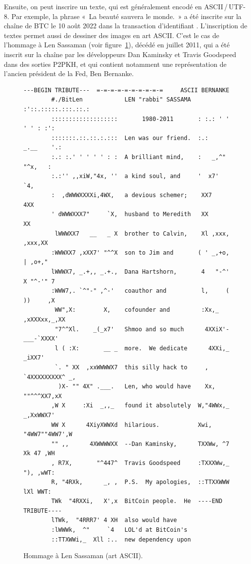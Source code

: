 Ensuite, on peut inscrire un texte, qui est généralement encodé en ASCII\,/\,UTF-8. Par exemple, la phrase «~La beauté sauvera le monde.~» a été inscrite sur la chaîne de BTC le 10 août 2022 dans la transaction d'identifiant . L'inscription de textes permet aussi de dessiner des images en art ASCII. C'est le cas de l'hommage à Len Sassaman (voir figure~\ref{fig:sassaman-tribute}), décédé en juillet 2011, qui a été inscrit sur la chaîne par les développeurs Dan Kaminsky et Travis Goodspeed dans des sorties P2PKH, et qui contient notamment une représentation de l'ancien président de la Fed, Ben Bernanke.

\begin{figure}[h]
  \begin{Verbatim}[fontsize=\footnotesize]
        ---BEGIN TRIBUTE---  =-=-=-=-=-=-=-=-=-=     ASCII BERNANKE
        #./BitLen            LEN "rabbi" SASSAMA  :'::.:::::.:::.::.:
        :::::::::::::::::::       1980-2011       : :.: ' ' ' ' : :':
        :::::::.::.::.:.:::  Len was our friend.  :.:     _.__    '.:
        :.: :.' ' ' ' ' : :  A brilliant mind,    :   _,^"   "^x,   :
        :.:'' ,,xiW,"4x, ''  a kind soul, and     '  x7'        `4,
        :  ,dWWWXXXXi,4WX,   a devious schemer;    XX7            4XX
        ' dWWWXXX7"     `X,  husband to Meredith   XX              XX
         lWWWXX7   __   _ X  brother to Calvin,    Xl ,xxx,   ,xxx,XX
        :WWWXX7 ,xXX7' "^^X  son to Jim and       ( ' _,+o, | ,o+,"
        lWWWX7, _.+,, _.+.,  Dana Hartshorn,       4   "-^' X "^-'" 7
        :WWW7,. `^"-" ,^-'   coauthor and          l,     ( ))     ,X
         WW",X:        X,    cofounder and         :Xx,_ ,xXXXxx,_,XX
         "7^^Xl.    _(_x7'   Shmoo and so much      4XXiX'-___-`XXXX'
         l ( :X:       __ _  more.  We dedicate      4XXi,_   _iXX7'
         `. " XX  ,xxWWWWX7  this silly hack to     , `4XXXXXXXXX^ _,
          )X- "" 4X" .___.   Len, who would have    Xx,  ""^^^XX7,xX
        ,W X     :Xi  _,,_   found it absolutely  W,"4WWx,_ _,XxWWX7'
        WW X      4XiyXWWXd  hilarious.           Xwi, "4WW7""4WW7',W
        "" ,,      4XWWWWXX  --Dan Kaminsky,      TXXWw, ^7 Xk 47 ,WH
        , R7X,       "^447^  Travis Goodspeed     :TXXXWw,_ "), ,wWT:
        R, "4RXk,      _, ,  P.S.  My apologies,  ::TTXXWWW lXl WWT:
        TWk  "4RXXi,   X',x  BitCoin people.  He  ----END TRIBUTE----
        lTWk,  "4RRR7' 4 XH  also would have
        :lWWWk,  ^"     `4   LOL'd at BitCoin's
        ::TTXWWi,_  Xll :..  new dependency upon
  \end{Verbatim}
  \caption{Hommage à Len Sassaman (art ASCII).}
  \label{fig:sassaman-tribute}
\end{figure}

